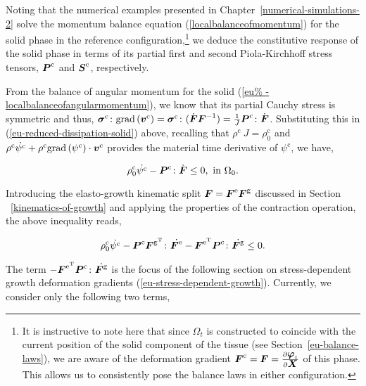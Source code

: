 Noting that the numerical examples presented in
Chapter~\ref{numerical-simulations-2} solve the momentum balance
equation (\ref{localbalanceofmomentum}) for the solid phase in the
reference configuration,\footnote{It is instructive to note here that
  since $\Omega_{t}$ is constructed to coincide with the current
  position of the solid component of the tissue (see
  Section~\ref{eu-balance-laws}), we are aware of the deformation
  gradient $\mbox{\boldmath$ F$}^{\mathrm{c}}=\mbox{\boldmath$ F$}=\frac{\partial \mbox{\boldmath$\varphi$}_{t}}{\partial
    \mbox{\boldmath$ X$}}$ of this phase. This allows us to consistently pose the
  balance laws in either configuration.} we deduce the constitutive
response of the solid phase in terms of its partial first and second
Piola-Kirchhoff stress tensors, $\mbox{\boldmath$ P$}^{\mathrm{c}}$ and
$\mbox{\boldmath$ S$}^{\mathrm{c}}$, respectively.

From the balance of angular momentum for the solid (\ref{eu%
  -localbalanceofangularmomentum}), we know that its partial Cauchy
stress is symmetric and thus, $\mbox{\boldmath$\sigma$}^{\mathrm{c}} \colon
\mathrm{grad} \left(\mbox{\boldmath$ v$}^{\mathrm{c}}\right) =\mbox{\boldmath$\sigma$}^{\mathrm{c}}
\colon (\dot{\mbox{\boldmath$ F$}}\mbox{\boldmath$ F$}^{-1}) =\frac{1}{J} \mbox{\boldmath$ P$}^{\mathrm{c}} \colon
\dot{\mbox{\boldmath$ F$}}$. Substituting this in (\ref{eu-reduced-dissipation-solid})
above, recalling that \mbox{$\rho^{\mathrm{c}}\ J =
  \rho_0^{\mathrm{c}}$} and $\rho^{\mathrm{c}}
\dot{\psi^{\mathrm{c}}}+ \rho^{\mathrm{c}}
\mathrm{grad}\left(\psi^{\mathrm{c}}\right) \cdot\mbox{\boldmath$ v$}^{\mathrm{c}}$
provides the material time derivative of $\psi^{\mathrm{c}}$, we have,

\begin{equation*}
\rho_{0}^{\mathrm{c}} \dot{\psi^{\mathrm{c}}}
-\bP^{\mathrm{c}}\colon\dot{\bF}\leq 0,\ \mathrm{in}\ \Omega_{0}.
\end{equation*}

\noindent Introducing the elasto-growth kinematic split
$\mbox{\boldmath$ F$}=\mbox{\boldmath$ F$}^{\mathrm{e}}\mbox{\boldmath$ F$}^{\mathrm{g}}$ discussed in Section%
~\ref{kinematics-of-growth} and applying the properties of the
contraction operation, the above inequality reads,

\begin{equation*}
\rho_{0}^{\mathrm{c}} \dot{\psi^{\mathrm{c}}} - \mbox{\boldmath$ P$}^{\mathrm{c}}
\mbox{\boldmath$ F$}^{\mathrm{g}^{\mathrm{T}}} \colon \dot{\mbox{\boldmath$ F$}^{\mathrm{e}}} -
\mbox{\boldmath$ F$}^{\mathrm{e}^{\mathrm{T}}} \mbox{\boldmath$ P$}^{\mathrm{c}} \colon
\dot{\mbox{\boldmath$ F$}^{\mathrm{g}}} \leq 0.
\end{equation*}

\noindent The term $-\mbox{\boldmath$ F$}^{\mathrm{e}^{\mathrm{T}}} \mbox{\boldmath$ P$}^{\mathrm{c}}
\colon \dot{\mbox{\boldmath$ F$}^{\mathrm{g}}}$ is the focus of the following section
on stress-dependent growth deformation gradients
(\ref{eu-stress-dependent-growth}). Currently, we consider only the
following two terms,

